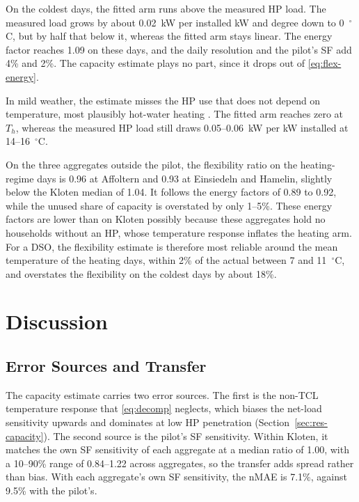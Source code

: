 On the coldest days, the fitted arm runs above the measured HP load. The measured load grows by about 0.02~kW per installed kW and degree down to 0~$^\circ$C, but by half that below it, whereas the fitted arm stays linear. The energy factor reaches 1.09 on these days, and the daily resolution and the pilot's SF add 4\% and 2\%. The capacity estimate plays no part, since it drops out of \eqref{eq:flex-energy}.

In mild weather, the estimate misses the HP use that does not depend on temperature, most plausibly hot-water heating \cite{Bru23}. The fitted arm reaches zero at $T_h$, whereas the measured HP load still draws 0.05--0.06~kW per kW installed at 14--16~$^\circ$C.

On the three aggregates outside the pilot, the flexibility ratio on the heating-regime days is 0.96 at Affoltern and 0.93 at Einsiedeln and Hamelin, slightly below the Kloten median of 1.04. It follows the energy factors of 0.89 to 0.92, while the unused share of capacity is overstated by only 1--5\%. These energy factors are lower than on Kloten possibly because these aggregates hold no households without an HP, whose temperature response inflates the heating arm. For a DSO, the flexibility estimate is therefore most reliable around the mean temperature of the heating days, within 2\% of the actual between 7 and 11~$^\circ$C, and overstates the flexibility on the coldest days by about 18\%.

\section{Discussion}
\label{sec:discussion}

\subsection{Error Sources and Transfer}
\label{sec:accuracy}

The capacity estimate carries two error sources. The first is the non-TCL temperature response that \eqref{eq:decomp} neglects, which biases the net-load sensitivity upwards and dominates at low HP penetration (Section~\ref{sec:res-capacity}). The second source is the pilot's SF sensitivity. Within Kloten, it matches the own SF sensitivity of each aggregate at a median ratio of 1.00, with a 10--90\% range of 0.84--1.22 across aggregates, so the transfer adds spread rather than bias. With each aggregate's own SF sensitivity, the nMAE is 7.1\%, against 9.5\% with the pilot's.

